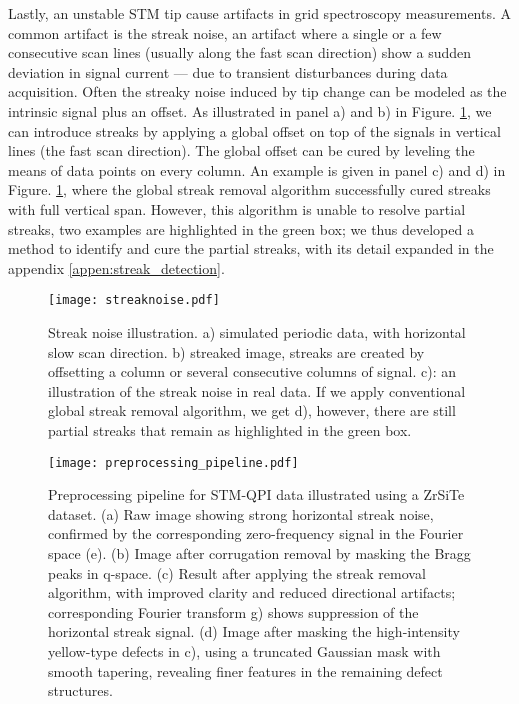 Lastly, an unstable \ac{STM} tip cause artifacts in grid spectroscopy measurements. A common  artifact is the streak noise, an artifact where a single or a few consecutive scan lines (usually along the fast scan direction) show a sudden deviation in signal current — due to transient disturbances during data acquisition. Often the streaky noise induced by tip change can be modeled as the intrinsic signal plus an offset. As illustrated in panel a) and b) in Figure. \ref{fig:streaks}, we can introduce streaks by applying a global offset on top of the signals in vertical lines (the fast scan direction). The global offset can be cured by leveling the means of data points on every column. An example is given in panel c) and d) in Figure. \ref{fig:streaks}, where the global streak removal algorithm successfully cured streaks with full vertical span. However, this algorithm is unable to resolve partial streaks, two examples are highlighted in the green box; we thus developed a method to identify and cure the partial streaks, with its detail expanded in the appendix \ref{appen:streak_detection}.

\begin{figure}
	\texttt{[image: streaknoise.pdf]} 
	\centering
	\caption{Streak noise illustration. a) simulated periodic data, with horizontal slow scan direction. b) streaked image, streaks are created by offsetting a column or several consecutive columns of signal. c): an illustration of the streak noise in real data. If we apply conventional global streak removal algorithm, we get d), however, there are still partial streaks that remain as highlighted in the green box.}
	\label{fig:streaks}
\end{figure}

\begin{figure}
	\texttt{[image: preprocessing\_pipeline.pdf]} 
	\centering
	\caption{Preprocessing pipeline for STM-QPI data illustrated using a ZrSiTe dataset. (a) Raw image showing strong horizontal streak noise, confirmed by the corresponding zero-frequency signal in the Fourier space (e). (b) Image after corrugation removal by masking the Bragg peaks in q-space. (c) Result after applying the streak removal algorithm, with improved clarity and reduced directional artifacts; corresponding Fourier transform g) shows suppression of the horizontal streak signal. (d) Image after masking the high-intensity yellow-type defects in c), using a truncated Gaussian mask with smooth tapering, revealing finer features in the remaining defect structures.}
	\label{fig:pipeline}
\end{figure}

